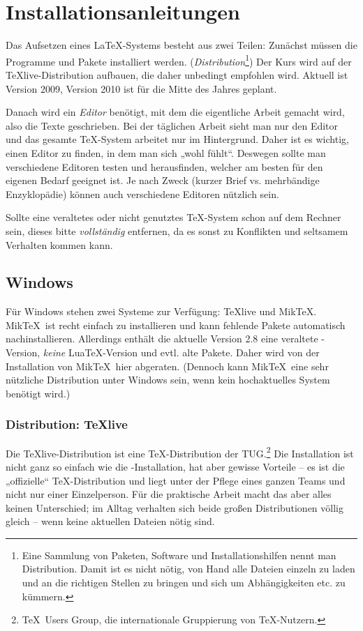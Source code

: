\documentclass[12pt,ngerman]{scrartcl}
\newcommand{\TeXlive}{\TeX\textsf{live}\xspace}
\newcommand{\luaTeX}{\textsf{Lua}\TeX\xspace}
\begin{document}
\section{Installationsanleitungen}
Das Aufsetzen eines \LaTeX-Systems besteht aus zwei Teilen: Zunächst müssen die Programme und Pakete installiert werden. (\emph{Distribution}\footnote{Eine Sammlung von Paketen, Software und Installationshilfen nennt man Distribution. Damit ist es nicht nötig, von Hand alle Dateien einzeln zu laden und an die richtigen Stellen zu bringen und sich um Abhängigkeiten etc. zu kümmern.}) Der Kurs wird auf der \TeXlive-Distribution aufbauen, die daher unbedingt empfohlen wird. Aktuell ist Version 2009, Version 2010 ist für die Mitte des Jahres geplant.

Danach wird ein \emph{Editor} benötigt, mit dem die eigentliche Arbeit gemacht wird, also die Texte geschrieben. Bei der täglichen Arbeit sieht man nur den Editor und das gesamte \TeX-System arbeitet nur im Hintergrund. Daher ist es wichtig, einen Editor zu finden, in dem man sich „wohl fühlt“. Deswegen sollte man verschiedene Editoren testen und herausfinden, welcher am besten für den eigenen Bedarf geeignet ist. Je nach Zweck (kurzer Brief vs. mehrbändige Enzyklopädie) können auch verschiedene Editoren nützlich sein.

Sollte eine veraltetes oder nicht genutztes \TeX-System schon auf dem Rechner sein, dieses bitte \emph{vollständig} entfernen, da es sonst zu Konflikten und seltsamem Verhalten kommen kann.

\subsection{Windows}
Für Windows stehen zwei Systeme zur Verfügung: \TeXlive und Mik\TeX. Mik\TeX\ ist recht einfach zu installieren und kann fehlende Pakete automatisch nachinstallieren. Allerdings enthält die aktuelle Version 2.8 eine veraltete \XeTeX-Version, \emph{keine} \luaTeX-Version und evtl. alte Pakete. Daher wird von der Installation von Mik\TeX\ hier abgeraten. (Dennoch kann Mik\TeX\ eine sehr nützliche Distribution unter Windows sein, wenn kein hochaktuelles System benötigt wird.)

\subsubsection{Distribution: \TeX\textbf{\textsf{live}}}
Die \TeXlive-Distribution ist eine \TeX-Distribution der TUG.\footnote{\TeX\ Users Group, die internationale Gruppierung von \TeX-Nutzern.} Die Installation ist nicht ganz so einfach wie die \MikTeX-Installation, hat aber gewisse Vorteile – es ist die „offizielle“ \TeX-Distribution und liegt unter der Pflege eines ganzen Teams und nicht nur einer Einzelperson. Für die praktische Arbeit macht das aber alles keinen Unterschied; im Alltag verhalten sich beide großen Distributionen völlig gleich – wenn keine aktuellen Dateien nötig sind.
\end{document}
